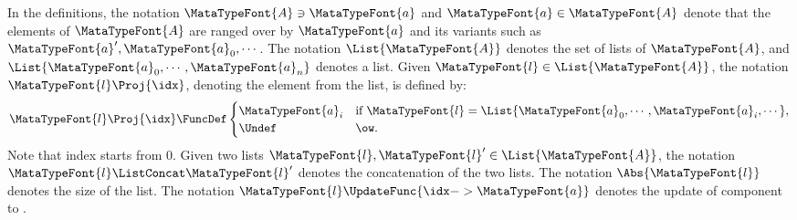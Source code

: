 In the definitions, 
the notation \(\MataTypeFont{A} \ni \MataTypeFont{a}\) and \(\MataTypeFont{a} \in \MataTypeFont{A}\) 
denote that the elements of \(\MataTypeFont{A}\) are ranged over
by \(\MataTypeFont{a}\) and its variants such as \(\MataTypeFont{a}', \MataTypeFont{a}_0, \cdots\).
The notation \( \List{\MataTypeFont{A}} \) denotes the set of lists of \( \MataTypeFont{A} \),
and \( \List{\MataTypeFont{a}_0, \cdots, \MataTypeFont{a}_n}\) denotes a list.
Given \( \MataTypeFont{l} \in \List{\MataTypeFont{A}}\), the notation
\( \MataTypeFont{l}\Proj{\idx} \), denoting the  element from the list, is defined by:
\[
    \MataTypeFont{l}\Proj{\idx} \FuncDef
    \begin{cases}
        \MataTypeFont{a}_i & \text{if} \ \MataTypeFont{l} = \List{\MataTypeFont{a}_0, \cdots, \MataTypeFont{a}_i, \cdots}  ,
        \\ \Undef & \ow .
    \end{cases}
\]
Note that index starts from 0.
Given two lists \( \MataTypeFont{l},\MataTypeFont{l}' \in \List{\MataTypeFont{A}} \),
the notation \(\MataTypeFont{l} \ListConcat \MataTypeFont{l}' \) denotes the concatenation of the two lists.
The notation \( \Abs{ \MataTypeFont{l} }\) denotes the size of the list.
The notation \( \MataTypeFont{l}\UpdateFunc{ \idx -> \MataTypeFont{a} } \) denotes the update of  component to .
